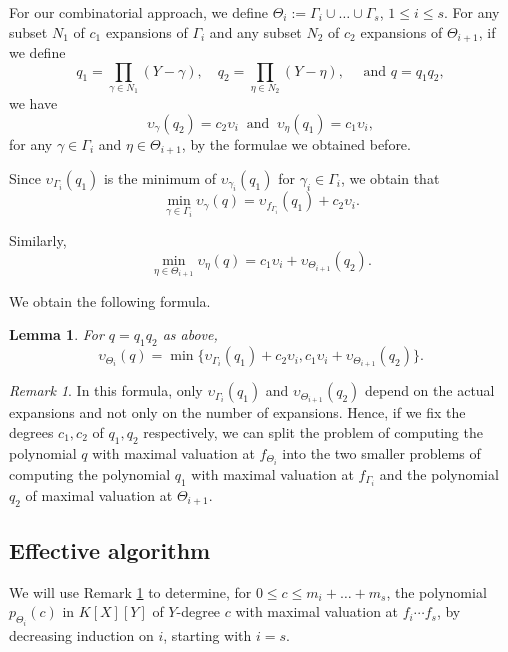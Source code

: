 \documentclass[a4paper,11pt]{amsart}%
\theoremstyle{definition}
\theoremstyle{plain}
\newtheorem{lemma}[defn]{Lemma}
\theoremstyle{remark}
\newtheorem{remark}[defn]{Remark}
\begin{document}
For our combinatorial approach, we define $\Theta_{i} := \Gamma_{i} \cup \dots \cup \Gamma_{s}$, $1 \le i \le s$.
For any subset $N_{1}$ of $c_{1}$ expansions of $\Gamma_{i}$ and any
subset $N_{2}$ of $c_{2}$ expansions of $\Theta_{i+1}$, if we define
$$
q_{1} = \prod_{\gamma\in N_{1}}(Y - \gamma), \quad
q_{2} = \prod_{\eta\in N_{2}}(Y - \eta), \quad
\text{ and } q = q_{1}q_{2},$$
we have
\[
\upsilon_{\gamma}(q_{2}) = c_{2} \upsilon_i \ \text{ and } \ \upsilon_{\eta}(q_{1}) = c_{1} \upsilon_i,
\]
for any $\gamma \in \Gamma_i$ and $\eta \in \Theta_{i+1}$, by the formulae we obtained before.

Since $\upsilon_{{\Gamma_{i}}}(q_{1})$ is the minimum of $\upsilon_{\gamma_{i}}%
(q_{1})$ for $\gamma_{i} \in\Gamma_{i}$, we obtain that
\[
\min_{\gamma\in\Gamma_{i}} \upsilon_{\gamma}(q) = \upsilon_{f_{\Gamma_{i}}}(q_{1}) +
c_{2} \upsilon_i.
\]

Similarly,
\[
\min_{\eta\in\Theta_{i+1}} \upsilon_{\eta}(q) = c_{1} \upsilon_i +
\upsilon_{{\Theta_{i+1}}}(q_{2}).
\]

We obtain the following formula.
\begin{lemma}
\label{formula:duples}
For $q = q_1 q_2$ as above,
\[\boxed{
\upsilon_{{\Theta_{i}}}(q) = \min\{\upsilon_{{\Gamma_{i}}}(q_{1}) + c_{2} \upsilon_i,
c_{1} \upsilon_i + \upsilon_{{\Theta_{i+1}}}(q_{2})\}.}
\]
\end{lemma}

\begin{remark}
\label{remark:duples}
In this formula, only $\upsilon_{{\Gamma_{i}}}(q_{1})$ and $\upsilon_{{\Theta_{i+1}}}(q_{2})$ depend on the actual expansions and not only on the number of expansions. Hence, if we fix the degrees $c_1, c_2$ of $q_1, q_2$ respectively, we can split the problem of computing the polynomial $q$ with maximal valuation at $f_{\Theta_{i}}$ into the two smaller problems of computing the polynomial $q_1$ with maximal valuation at $f_{\Gamma_{i}}$ and the polynomial $q_2$ of maximal valuation at ${\Theta_{i+1}}$.
\end{remark}

\subsection{Effective algorithm}
We will use Remark \ref{remark:duples} to determine, for $0 \leq c \leq m_{i} +
\dots+ m_{s}$, the polynomial $p_{\Theta_{i}}(c)$ in $K[X][Y]$ of $Y$-degree $c$ with maximal valuation at $f_i \cdots f_s$, by decreasing induction on $i$, starting with $i = s$.
\end{document}
